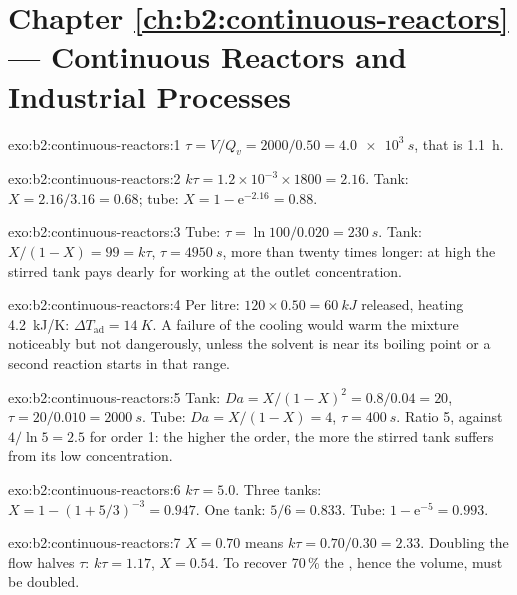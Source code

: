 \section*{Chapter \ref{ch:b2:continuous-reactors} --- Continuous Reactors and Industrial Processes}

\begin{solution}{exo:b2:continuous-reactors:1}
$\tau = V/Q_v = 2000/0.50 = \qty{4.0e3}{s}$, that is \qty{1.1}{h}.
\end{solution}

\begin{solution}{exo:b2:continuous-reactors:2}
$k\tau = 1.2 \times 10^{-3} \times 1800 = 2.16$. Tank: $X = 2.16/3.16 = 0.68$;
tube: $X = 1 - \mathrm e^{-2.16} = 0.88$.
\end{solution}

\begin{solution}{exo:b2:continuous-reactors:3}
Tube: $\tau = \ln 100/0.020 = \qty{230}{s}$. Tank: $X/(1 - X) = 99 = k\tau$,
$\tau = \qty{4950}{s}$, more than twenty times longer: at high  the
stirred tank pays dearly for working at the outlet concentration.
\end{solution}

\begin{solution}{exo:b2:continuous-reactors:4}
Per litre: $120 \times 0.50 = \qty{60}{kJ}$ released, heating
\qty{4.2}{kJ/K}: $\Delta T_{\text{ad}} = \qty{14}{K}$. A failure of the cooling
would warm the mixture noticeably but not dangerously, unless the solvent is
near its boiling point or a second reaction starts in that range.
\end{solution}

\begin{solution}{exo:b2:continuous-reactors:5}
Tank: $Da = X/(1 - X)^2 = 0.8/0.04 = 20$, $\tau = 20/0.010 = \qty{2000}{s}$.
Tube: $Da = X/(1 - X) = 4$, $\tau = \qty{400}{s}$. Ratio 5, against $4/\ln 5 =
2.5$ for order 1: the higher the order, the more the stirred tank suffers
from its low concentration.
\end{solution}

\begin{solution}{exo:b2:continuous-reactors:6}
$k\tau = 5.0$. Three tanks: $X = 1 - (1 + 5/3)^{-3} = 0.947$. One tank: $5/6 =
0.833$. Tube: $1 - \mathrm e^{-5} = 0.993$.
\end{solution}

\begin{solution}{exo:b2:continuous-reactors:7}
$X = 0.70$ means $k\tau = 0.70/0.30 = 2.33$. Doubling the flow halves $\tau$:
$k\tau = 1.17$, $X = 0.54$. To recover 70\,\% the , hence the
volume, must be doubled.
\end{solution}

